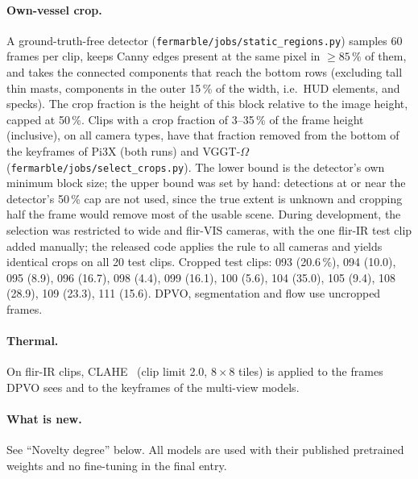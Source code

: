 \documentclass[11pt]{article}
\begin{document}
\paragraph{Own-vessel crop.}
A ground-truth-free detector (\texttt{fermarble/jobs/static\_regions.py}) samples 60 frames per clip, keeps Canny
edges present at the same pixel in $\ge85\,\%$ of them, and takes the connected components that reach the bottom rows
(excluding tall thin masts, components in the outer 15\,\% of the width, i.e.\ HUD elements, and specks). The crop
fraction is the height of this block relative to the image height, capped at 50\,\%. Clips with a crop fraction of
3--35\,\% of the frame height (inclusive), on all camera types, have that fraction removed from the bottom of the
keyframes of Pi3X (both runs) and VGGT-$\Omega$ (\texttt{fermarble/jobs/select\_crops.py}). The lower bound is the
detector's own minimum block size; the upper bound was set by hand: detections at or near the detector's 50\,\% cap
are not used, since the true extent is unknown and cropping half the frame would remove most of the usable scene.
During development, the selection was restricted to wide and flir-VIS cameras, with the one flir-IR test clip added
manually; the released code applies the rule to all cameras and yields identical crops on all 20 test clips.
Cropped test clips: 093 (20.6\,\%), 094 (10.0), 095 (8.9), 096 (16.7), 098 (4.4), 099 (16.1), 100 (5.6), 104 (35.0),
105 (9.4), 108 (28.9), 109 (23.3), 111 (15.6). DPVO, segmentation and flow use uncropped frames.

\paragraph{Thermal.}
On flir-IR clips, CLAHE~\cite{zuiderveld1994clahe} (clip limit 2.0, $8\times8$ tiles) is applied to the frames
DPVO sees and to the keyframes of the multi-view models.

\paragraph{What is new.}
See ``Novelty degree'' below. All models are used with their published pretrained weights and no fine-tuning in the final entry.
\end{document}
